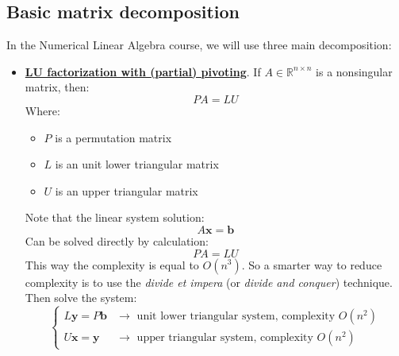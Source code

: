 \subsection{Basic matrix decomposition}

In the Numerical Linear Algebra course, we will use three main decomposition:
\begin{itemize}
	\item \underline{\textbf{LU factorization with (partial) pivoting}}. If $A \in \mathbb{R}^{n \times n}$ is a nonsingular matrix, then:
	\begin{equation*}
		PA = LU
	\end{equation*}
	Where:
	\begin{itemize}
		\item $P$ is a permutation matrix
		\item $L$ is an unit lower triangular matrix
		\item $U$ is an upper triangular matrix
	\end{itemize}
	Note that the linear system solution:
	\begin{equation*}
		A\mathbf{x} = \mathbf{b}
	\end{equation*}
	Can be solved directly by calculation:
	\begin{equation*}
		PA = LU
	\end{equation*}
	This way the complexity is equal to $O\left(n^{3}\right)$. So a smarter way to reduce complexity is to use the \emph{divide et impera} (or \emph{divide and conquer}) technique. Then solve the system:
	\begin{equation*}
		\begin{cases}
			L\mathbf{y} = P\mathbf{b} & \rightarrow \text{ unit lower triangular system, complexity } O\left(n^{2}\right) \\
			U\mathbf{x} = \mathbf{y}  & \rightarrow \text{ upper triangular system, complexity } O\left(n^{2}\right)
		\end{cases}
	\end{equation*}


\end{itemize}
